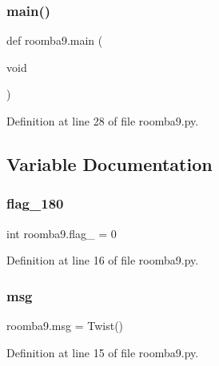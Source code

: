 \subsubsection{\texorpdfstring{main()}{main()}}
{\footnotesize\ttfamily def roomba9.\+main (\begin{DoxyParamCaption}\item[{void}]{ }\end{DoxyParamCaption})}



Definition at line 28 of file roomba9.\+py.



\subsection{Variable Documentation}
\mbox{\label{namespaceroomba9_a743412de1a5ddf3fac078d878ede1113}} 
\subsubsection{\texorpdfstring{flag\_180}{flag\_180}}
{\footnotesize\ttfamily int roomba9.\+flag\+\_ = 0}



Definition at line 16 of file roomba9.\+py.

\mbox{\label{namespaceroomba9_a2cdab353ac92c820d7193a9970298d4a}} 
\subsubsection{\texorpdfstring{msg}{msg}}
{\footnotesize\ttfamily roomba9.\+msg = Twist()}



Definition at line 15 of file roomba9.\+py.

